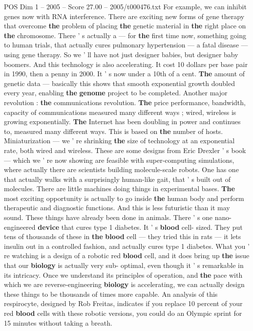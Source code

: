 \begin{textsample}{POS Dim 1 – 2005 – Score 27.00 – 2005/t000476.txt}
For example, we can inhibit genes now with RNA interference.
There are exciting new forms of gene therapy that overcome \textbf{the} problem of placing \textbf{the} genetic material in \textbf{the} right place on \textbf{the} chromosome.
There ' s actually a — for \textbf{the} first time now, something going to human trials, that actually cures pulmonary hypertension — a fatal disease — using gene therapy.
So we ' ll have not just designer babies, but designer baby boomers.
And this technology is also accelerating.
It cost 10 dollars per base pair in 1990, then a penny in 2000.
It ' s now under a 10th of a cent. \textbf{The} amount of genetic data — basically this shows that smooth exponential growth doubled every year, enabling \textbf{the} \textbf{genome} project to be completed.
Another major revolution : \textbf{the} communications revolution. \textbf{The} price performance, bandwidth, capacity of communications measured many different ways ; wired, wireless is growing exponentially. \textbf{The} Internet has been doubling in power and continues to, measured many different ways.
This is based on \textbf{the} number of hosts.
Miniaturization — we ' re shrinking \textbf{the} size of technology at an exponential rate, both wired and wireless.
These are some designs from Eric Drexler ' s book — which we ' re now showing are feasible with super-computing simulations, where actually there are scientists building molecule-scale robots.
One has one that actually walks with a surprisingly human-like gait, that ' s built out of molecules.
There are little machines doing things in experimental bases. \textbf{The} most exciting opportunity is actually to go inside \textbf{the} human body and perform therapeutic and diagnostic functions.
And this is less futuristic than it may sound.
These things have already been done in animals.
There ' s one nano-engineered \textbf{device} that cures type 1 diabetes.
It ' s \textbf{blood} cell- sized.
They put tens of thousands of these in \textbf{the} \textbf{blood} cell — they tried this in rats — it lets insulin out in a controlled fashion, and actually cures type 1 diabetes.
What you ' re watching is a design of a robotic red \textbf{blood} cell, and it does bring up \textbf{the} issue that our \textbf{biology} is actually very sub- optimal, even though it ' s remarkable in its intricacy.
Once we understand its principles of operation, and \textbf{the} pace with which we are reverse-engineering \textbf{biology} is accelerating, we can actually design these things to be thousands of times more capable.
An analysis of this respirocyte, designed by Rob Freitas, indicates if you replace 10 percent of your red \textbf{blood} cells with these robotic versions, you could do an Olympic sprint for 15 minutes without taking a breath.

\end{textsample}
